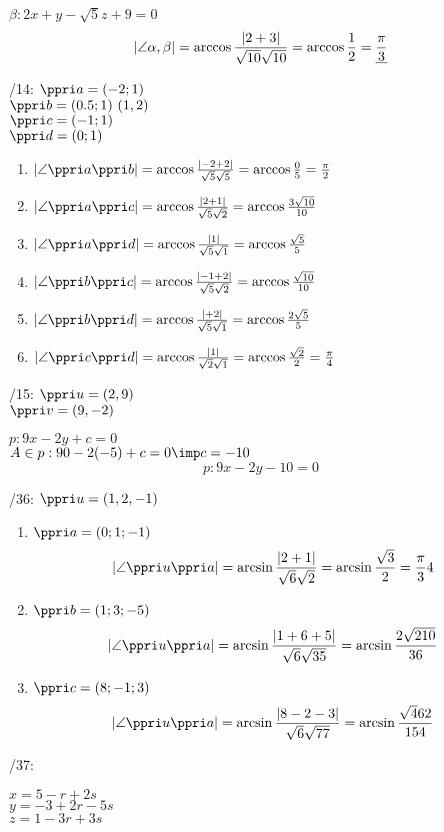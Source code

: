 $\beta:2x+y-\sqrt{5}z+9=0$
$$|\angle \alpha,\beta|= \arccos\frac{|2+3|}{\sqrt{10}\sqrt{10}} = \arccos\frac12 = \underline{\frac\pi3}$$

/14:
$\ve a = (-2;1)$\\
$\ve b = (0.5;1) ~ (1,2)$\\
$\ve c = (-1;1)$\\
$\ve d = (0;1)$\\

\begin{enumerate}
	\item $|\angle \ve{a}\ve{b}| = \arccos \f{|-2+2|}{\sqrt{5}\*\sqrt 5} = \arccos \f{0}{5} = \f\pi2$
	\item $|\angle \ve{a}\ve{c}| = \arccos \f{|2+1|}{\sqrt{5}\*\sqrt 2} = \arccos \f{3\sqrt{10}}{10} $
	\item $|\angle \ve{a}\ve{d}| = \arccos \f{|1|}{\sqrt{5}\*\sqrt 1} = \arccos \f{\sqrt 5}{5}$
	\item $|\angle \ve{b}\ve{c}| = \arccos \f{|-1+2|}{\sqrt{5}\*\sqrt 2} = \arccos \f{\sqrt{10}}{10} $
	\item $|\angle \ve{b}\ve{d}| = \arccos \f{|+2|}{\sqrt{5}\*\sqrt 1} = \arccos \f{2\sqrt5}{5}$
	\item $|\angle \ve{c}\ve{d}| = \arccos \f{|1|}{\sqrt{2}\*\sqrt 1} = \arccos \f{\sqrt 2}{2} = \f\pi4$
\end{enumerate}

/15:
$\ve u = (2,9)$\\
$\ve v = (9,-2)$

$p:9x-2y+c  = 0 $\\
$A\in p : 9\*0-2(-5)+c = 0 \imp c = -10$
$$p:9x-2y-10  = 0 $$

/36:
$\ve u = (1,2,-1)$
\begin{enumerate}
	\item  $ \ve a = (0;1;-1) $
		$$|\angle \ve{u}\ve{a}| = \arcsin \f{|2+1|}{\sqrt{6}\*\sqrt 2} = \arcsin \f{\sqrt 3}{2} = \f\pi34$$
	\item  $ \ve b = (1;3;-5) $
		$$|\angle \ve{u}\ve{a}| = \arcsin \f{|1+6+5|}{\sqrt{6}\*\sqrt{35}} = \arcsin \f{2\sqrt{210}}{36}$$

	\item  $ \ve c = (8;-1;3) $
		$$|\angle \ve{u}\ve{a}| = \arcsin \f{|8-2-3|}{\sqrt{6}\*\sqrt{77}} = \arcsin \f{\sqrt 462}{154}$$

\end{enumerate}

/37:

$x=5-r+2s$\\
$y=-3+2r-5s$\\
$z=1-3r+3s$

